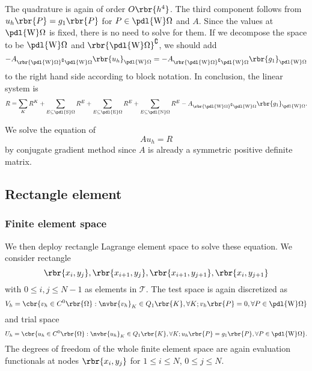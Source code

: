 \documentclass[english, nochinese]{pnote}
\begin{document}
The quadrature is again of order $ O \rbr{h^4} $. The third component follows from $ u_h \rbr{P} = g_1 \rbr{P} $ for $ P \in \pdl{\text{W}} \Omega $ and $A$. Since the values at $ \pdl{\text{W}} \Omega $ is fixed, there is no need to solve for them. If we decompose the space to be $ \pdl{\text{W}} \Omega $ and $ \rbr{ \pdl{\text{W}} \Omega }^{\complement} $, we should add
\begin{equation}
-A_{ \rbr{ \pdl{\text{W}} \Omega }^{\complement} \pdl{\text{W}} \Omega } \rbr{u_h}_{ \pdl{\text{W}} \Omega } = -A_{ \rbr{ \pdl{\text{W}} \Omega }^{\complement} \pdl{\text{W}} \Omega } \rbr{g_1}_{ \pdl{\text{W}} \Omega }
\end{equation}
to the right hand side according to block notation. In conclusion, the linear system is
\begin{equation}
R = \sum_K R^K + \sum_{ E \subseteq \pdl{\text{S}} \Omega } R^E + \sum_{ E \subseteq \pdl{\text{E}} \Omega } R^E + \sum_{ E \subseteq \pdl{\text{N}} \Omega } R^E - A_{ \rbr{ \pdl{\text{W}} \Omega }^{\complement} \pdl{\text{W}} \Omega } \rbr{g_1}_{ \pdl{\text{W}} \Omega }.
\end{equation}

We solve the equation of
\begin{equation}
A u_h = R
\end{equation}
by conjugate gradient method since $A$ is already a symmetric positive definite matrix.

\subsection{Rectangle element}

\subsubsection{Finite element space}

We then deploy rectangle Lagrange element space to solve these equation. We consider rectangle
\begin{equation}
\rbr{ x_i, y_j }, \rbr{ x_{ i + 1 }, y_j }, \rbr{ x_{ i + 1 }, y_{ j + 1 } }, \rbr{ x_i, y_{ j + 1 } }
\end{equation}
with $ 0 \le i, j \le N - 1 $ as elements in $\mathcal{T}$. The test space is again discretized as
\begin{equation}
V_h = \cbr{ v_h \in C^0 \rbr{\Omega} : \nvbr{v_h}_K \in Q_1 \rbr{K}, \forall K; v_h \rbr{P} = 0, \forall P \in \pdl{\text{W}} \Omega }
\end{equation}
and trial space
\begin{equation}
U_h = \cbr{ u_h \in C^0 \rbr{\Omega} : \nvbr{u_h}_K \in Q_1 \rbr{K}, \forall K; u_h \rbr{P} = g_1 \rbr{P}, \forall P \in \pdl{\text{W}} \Omega }.
\end{equation}
The degrees of freedom of the whole finite element space are again evaluation functionals at nodes $ \rbr{ x_i, y_j } $ for $ 1 \le i \le N $, $ 0 \le j \le N $.
\end{document}
